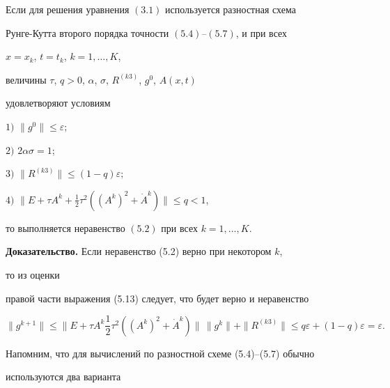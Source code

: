  


\begin{thm} 


Если для решения уравнения $(3.1)$ используется разностная схема 


Рун\-ге-Кут\-та второго порядка точности $(5.4)$--$(5.7)$, и при всех 


$x=x_k$, $t=t_k$, $k=1,\dotsc,K$, 


величины $\tau$, $q>0$, $\alpha$, $\sigma$, $R^{(k3)}$, $g^0$, $A(x,t)$ 


удовлетворяют условиям 


 


$1)$ $\|g^0\|\le\varepsilon;$ 


 


$2)$ $2\alpha\sigma=1;$ 


 


$3)$ $\|R^{(k3)}\|\le(1-q)\varepsilon;$ 


 


$4)$ $\big\|E+\tau A^k+\frac{1}{2}\tau^2((A^k)^2+\Dot A^k)\big\|\le q<1$, 


 


\noindent{}то выполняется неравенство $(5.2)$ при всех $k=1,\dotsc,K$. 


\end{thm} 


 


{\bf Доказательство.} Если неравенство (5.2) верно при некотором $k$, 


то из оценки 


правой части выражения (5.13) следует, что будет верно и неравенство 


$$ 


\|g^{k+1}\|\le\bigg\|E+\tau A^k\frac{1}{2}\tau^2((A^k)^2+ 


\Dot A^k)\bigg\|\,\|g^k\|+\|R^{(k3)}\|\le q\varepsilon+ 


(1-q)\varepsilon=\varepsilon. 


$$ 


 


Напомним, что для вычислений по разностной схеме (5.4)--(5.7) обычно 


используются два варианта 


